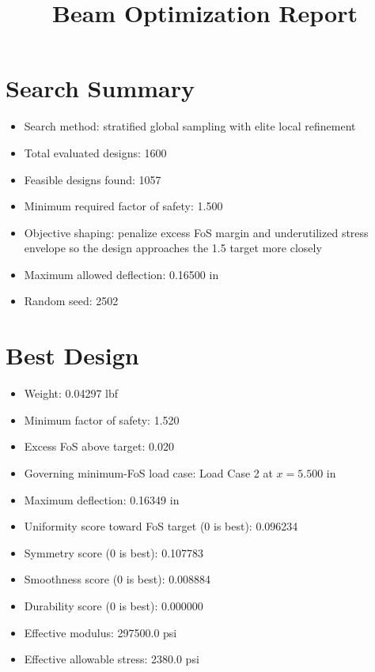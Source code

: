 \documentclass[11pt]{article}
\title{Beam Optimization Report}
\date{}
\begin{document}
\maketitle

\section*{Search Summary}
\begin{itemize}
\item Search method: stratified global sampling with elite local refinement
\item Total evaluated designs: 1600
\item Feasible designs found: 1057
\item Minimum required factor of safety: 1.500
\item Objective shaping: penalize excess FoS margin and underutilized stress envelope so the design approaches the 1.5 target more closely
\item Maximum allowed deflection: 0.16500 in
\item Random seed: 2502
\end{itemize}

\section*{Best Design}
\begin{itemize}
\item Weight: 0.04297 lbf
\item Minimum factor of safety: 1.520
\item Excess FoS above target: 0.020
\item Governing minimum-FoS load case: Load Case 2 at $x=5.500$ in
\item Maximum deflection: 0.16349 in
\item Uniformity score toward FoS target (0 is best): 0.096234
\item Symmetry score (0 is best): 0.107783
\item Smoothness score (0 is best): 0.008884
\item Durability score (0 is best): 0.000000
\item Effective modulus: 297500.0 psi
\item Effective allowable stress: 2380.0 psi
\end{itemize}
\end{document}
